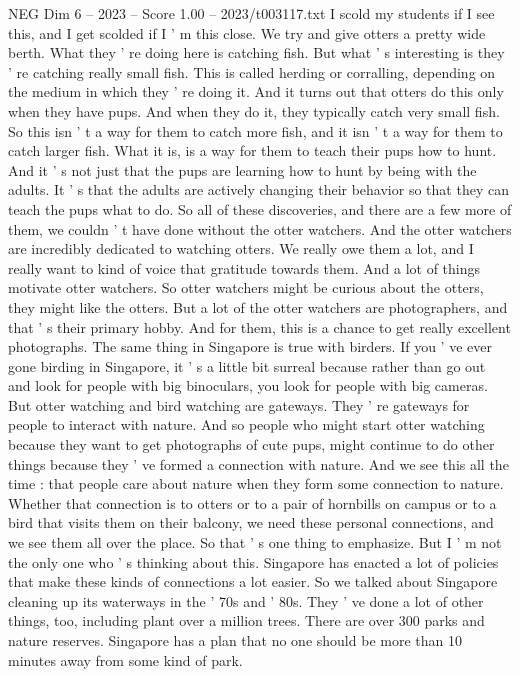 \begin{textsample}{NEG Dim 6 – 2023 – Score 1.00 – 2023/t003117.txt}
I scold my students if I see this, and I get scolded if I ' m this close.
We try and give otters a pretty wide berth.
What they ' re doing here is catching fish.
But what ' s interesting is they ' re catching really small fish.
This is called herding or corralling, depending on the medium in which they ' re doing it.
And it turns out that otters do this only when they have pups.
And when they do it, they typically catch very small fish.
So this isn ' t a way for them to catch more fish, and it isn ' t a way for them to catch larger fish.
What it is, is a way for them to teach their pups how to hunt.
And it ' s not just that the pups are learning how to hunt by being with the adults.
It ' s that the adults are actively changing their behavior so that they can teach the pups what to do.
So all of these discoveries, and there are a few more of them, we couldn ' t have done without the otter watchers.
And the otter watchers are incredibly dedicated to watching otters.
We really owe them a lot, and I really want to kind of voice that gratitude towards them.
And a lot of things motivate otter watchers.
So otter watchers might be curious about the otters, they might like the otters.
But a lot of the otter watchers are photographers, and that ' s their primary hobby.
And for them, this is a chance to get really excellent photographs.
The same thing in Singapore is true with birders.
If you ' ve ever gone birding in Singapore, it ' s a little bit surreal because rather than go out and look for people with big binoculars, you look for people with big cameras.
But otter watching and bird watching are gateways.
They ' re gateways for people to interact with nature.
And so people who might start otter watching because they want to get photographs of cute pups, might continue to do other things because they ' ve formed a connection with nature.
And we see this all the time : that people care about nature when they form some connection to nature.
Whether that connection is to otters or to a pair of hornbills on campus or to a bird that visits them on their balcony, we need these personal connections, and we see them all over the place.
So that ' s one thing to emphasize.
But I ' m not the only one who ' s thinking about this.
Singapore has enacted a lot of policies that make these kinds of connections a lot easier.
So we talked about Singapore cleaning up its waterways in the ' 70s and ' 80s.
They ' ve done a lot of other things, too, including plant over a million trees.
There are over 300 parks and nature reserves.
Singapore has a plan that no one should be more than 10 minutes away from some kind of park.

\end{textsample}
